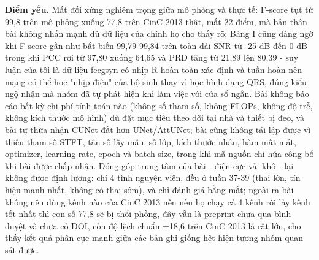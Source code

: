 \documentclass[12pt,a4paper]{article}
\begin{document}
\noindent \textbf{Điểm yếu.} Mất đối xứng nghiêm trọng giữa mô phỏng và thực tế: F-score tụt từ 99,8 trên mô phỏng xuống 77,8 trên CinC 2013 thật, mất 22 điểm, mà bản thân bài không nhấn mạnh dù dữ liệu của chính họ cho thấy rõ; Bảng I cũng đáng ngờ khi F-score gần như bất biến 99,79-99,84 trên toàn dải SNR từ -25 dB đến 0 dB trong khi PCC rơi từ 97,80 xuống 64,65 và PRD tăng từ 21,89 lên 80,39 - suy luận của tôi là dữ liệu fecgsyn có nhịp R hoàn toàn xác định và tuần hoàn nên mạng có thể học "nhịp điệu" của bộ sinh thay vì học hình dạng QRS, đúng kiểu ngộ nhận mà nhóm đã tự phát hiện khi làm việc với cửa sổ ngắn. Bài không báo cáo bất kỳ chi phí tính toán nào (không số tham số, không FLOPs, không độ trễ, không kích thước mô hình) dù đặt mục tiêu theo dõi tại nhà và thiết bị đeo, và bài tự thừa nhận CUNet đắt hơn UNet/AttUNet; bài cũng không tái lập được vì thiếu tham số STFT, tần số lấy mẫu, số lớp, kích thước nhân, hàm mất mát, optimizer, learning rate, epoch và batch size, trong khi mã nguồn chỉ hứa công bố khi bài được chấp nhận. Đóng góp trung tâm của bài - điện cực vải khô - lại không được định lượng: chỉ 4 tình nguyện viên, đều ở tuần 37-39 (thai lớn, tín hiệu mạnh nhất, không có thai sớm), và chỉ đánh giá bằng mắt; ngoài ra bài không nêu dùng kênh nào của CinC 2013 nên nếu họ chạy cả 4 kênh rồi lấy kênh tốt nhất thì con số 77,8 sẽ bị thổi phồng, đây vẫn là preprint chưa qua bình duyệt và chưa có DOI, còn độ lệch chuẩn ±18,6 trên CinC 2013 là rất lớn, cho thấy kết quả phân cực mạnh giữa các bản ghi giống hệt hiện tượng nhóm quan sát được.\par\vspace{3pt}
\end{document}
